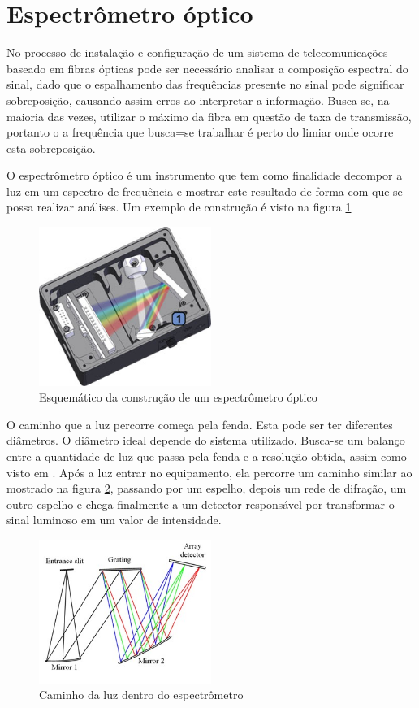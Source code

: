 \documentclass[article]{IEEEtran}
\begin{document}
\section{Espectrômetro óptico}
No processo de instalação e configuração de um sistema de telecomunicações baseado em fibras ópticas pode ser necessário analisar a composição espectral do sinal, dado que o espalhamento das frequências presente no sinal pode significar sobreposição, causando assim erros ao interpretar a informação. Busca-se, na maioria das vezes, utilizar o máximo da fibra em questão de taxa de transmissão, portanto o a frequência que busca=se trabalhar é perto do limiar onde ocorre esta sobreposição.
 
O espectrômetro óptico é um instrumento que tem como finalidade decompor a luz em um espectro de frequência e mostrar este resultado de forma com que se possa realizar análises. Um exemplo de construção é visto na figura \ref{fig:espectrometro_esquematico}

\begin{figure}[H]
	\includegraphics[width=0.5\textwidth]{images/esquematico_espectrometro.jpeg}
	\caption{Esquemático da construção de um espectrômetro óptico}
	\label{fig:espectrometro_esquematico}
\end{figure} 

O caminho que a luz percorre começa pela fenda. Esta pode ser ter diferentes diâmetros. O diâmetro ideal depende do sistema utilizado. Busca-se um balanço entre a quantidade de luz que passa pela fenda e a resolução obtida, assim como visto em \cite{SPECTROMETES}. Após a luz entrar no equipamento, ela percorre um caminho similar ao mostrado na figura \ref{fig:caminho_luz}, passando por um espelho, depois um rede de difração, um outro espelho e chega finalmente a um detector responsável por transformar o sinal luminoso em um valor de intensidade.

\begin{figure}[H]
	\includegraphics[width=0.5\textwidth, height=0.35\textwidth]{images/caminho_luz.jpg}
	\caption{Caminho da luz dentro do espectrômetro}
	\label{fig:caminho_luz}
\end{figure}  
\end{document}
